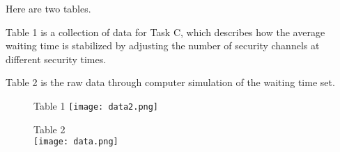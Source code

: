 \documentclass{mcmthesis}
\begin{document}
\begin{appendices}
\par Here are two tables.
\par Table 1 is a collection of data for Task C, which describes how the average waiting time is stabilized by adjusting the number of security channels at different security times.
\par Table 2 is the raw data through computer simulation of the waiting time set.
\begin{figure}[h]
\small
\centering
Table 1
\texttt{[image: data2.png]}
\end{figure}
    
\begin{figure}[h]
\small
\centering
Table 2\\
\texttt{[image: data.png]}
\end{figure}


\end{appendices}
\end{document}
